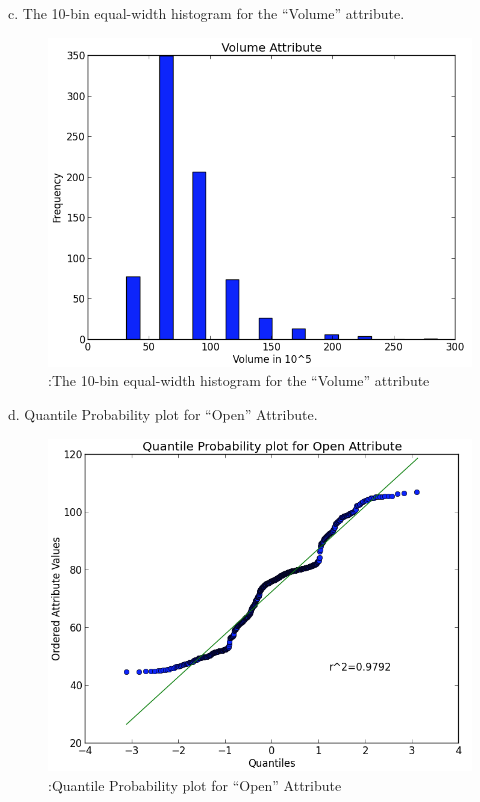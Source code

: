 \documentclass[10pt]{article}
\begin{document}
\begin{flushleft}
\begin{figure}[!htb]
\label{fig::A boxplot for the ``Open'' and ``Close/Last'' attributes} 
\end{figure}
c. The 10-bin equal-width histogram for the ``Volume'' attribute.\\
\begin{figure}[!htb]
\includegraphics{Plot-3_1}
\caption{:The 10-bin equal-width histogram for the ``Volume'' attribute}   
\label{fig::The 10-bin equal-width histogram for the ``Volume'' attribute} 
\end{figure}
\vspace{30em}
d. Quantile Probability plot for ``Open'' Attribute.\\
\begin{figure}[!htb]
\includegraphics{Plot-4_1}
\caption{:Quantile Probability plot for ``Open'' Attribute}   
\label{fig::Quantile Probability plot for ``Open'' Attribute} 
\end{figure}
\end{flushleft}
\end{document}
